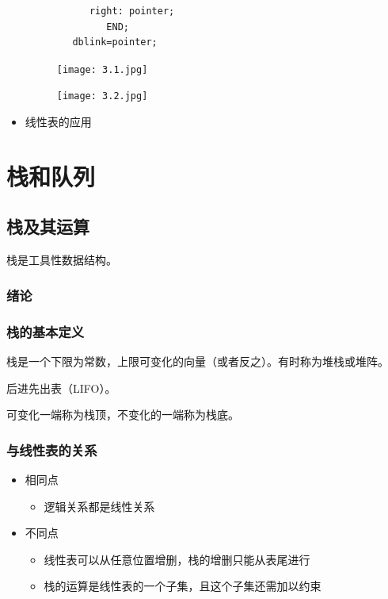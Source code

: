 \documentclass[AutoFakeBold]{LZUThesis2007}
\begin{document}
\begin{itemize}
\begin{itemize}
\begin{lstlisting}
		right: pointer;
           END;
     dblink=pointer;
\end{lstlisting}
		\end{itemize}
\begin{figure}[H]
    \centering
    \texttt{[image: 3.1.jpg]}
    \label{fig_install_texlive}
\end{figure}
\begin{figure}[H]
    \centering
    \texttt{[image: 3.2.jpg]}
    \label{fig_install_texlive}
\end{figure}
	\item 线性表的应用
\end{itemize}


\chapter{栈和队列}
	\section{栈及其运算}
	栈是工具性数据结构。
		\subsection{绪论}
		\subsection{栈的基本定义}
		栈是一个下限为常数，上限可变化的向量（或者反之）。有时称为堆栈或堆阵。

		后进先出表（LIFO）。

		可变化一端称为栈顶，不变化的一端称为栈底。

		\subsection{与线性表的关系}
			\begin{itemize}
				\item 相同点
					\begin{itemize}
						\item 逻辑关系都是线性关系
					\end{itemize}

				\item 不同点
					\begin{itemize}
						\item 线性表可以从任意位置增删，栈的增删只能从表尾进行
						\item 栈的运算是线性表的一个子集，且这个子集还需加以约束
					\end{itemize}

			\end{itemize}
\end{document}
